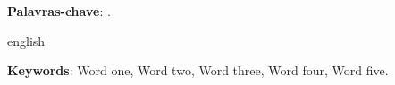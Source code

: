 \begin{resumoumacoluna}

    \lipsum[1-3]

    \vspace{\onelineskip}

    \noindent
    \textbf{Palavras-chave}: \ValorDasPalavrasChave{}.
\end{resumoumacoluna}

\renewcommand{\resumoname}{Abstract}
\begin{resumoumacoluna}
    \begin{otherlanguage*}{english}

        \lipsum[4-6]

        \vspace{\onelineskip}

        \noindent
        \textbf{Keywords}: Word one, Word two, Word three, Word four, Word five.
    \end{otherlanguage*}
\end{resumoumacoluna}
